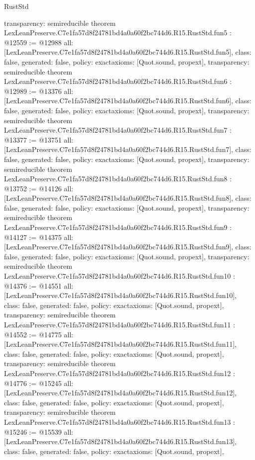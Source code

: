 \begin{lexlean}{RustStd}
\begin{coremodule}
{  transparency: semireducible
}
theorem LexLeanPreserve.C7e1fa57d8f24781bd4a0a60f2bc744d6.R15.RustStd.fun5 : @12559 := @12988 {
  all: [LexLeanPreserve.C7e1fa57d8f24781bd4a0a60f2bc744d6.R15.RustStd.fun5],
  class: false,
  generated: false,
  policy: exact{axioms: [Quot.sound, propext]},
  transparency: semireducible
}
theorem LexLeanPreserve.C7e1fa57d8f24781bd4a0a60f2bc744d6.R15.RustStd.fun6 : @12989 := @13376 {
  all: [LexLeanPreserve.C7e1fa57d8f24781bd4a0a60f2bc744d6.R15.RustStd.fun6],
  class: false,
  generated: false,
  policy: exact{axioms: [Quot.sound, propext]},
  transparency: semireducible
}
theorem LexLeanPreserve.C7e1fa57d8f24781bd4a0a60f2bc744d6.R15.RustStd.fun7 : @13377 := @13751 {
  all: [LexLeanPreserve.C7e1fa57d8f24781bd4a0a60f2bc744d6.R15.RustStd.fun7],
  class: false,
  generated: false,
  policy: exact{axioms: [Quot.sound, propext]},
  transparency: semireducible
}
theorem LexLeanPreserve.C7e1fa57d8f24781bd4a0a60f2bc744d6.R15.RustStd.fun8 : @13752 := @14126 {
  all: [LexLeanPreserve.C7e1fa57d8f24781bd4a0a60f2bc744d6.R15.RustStd.fun8],
  class: false,
  generated: false,
  policy: exact{axioms: [Quot.sound, propext]},
  transparency: semireducible
}
theorem LexLeanPreserve.C7e1fa57d8f24781bd4a0a60f2bc744d6.R15.RustStd.fun9 : @14127 := @14375 {
  all: [LexLeanPreserve.C7e1fa57d8f24781bd4a0a60f2bc744d6.R15.RustStd.fun9],
  class: false,
  generated: false,
  policy: exact{axioms: [Quot.sound, propext]},
  transparency: semireducible
}
theorem LexLeanPreserve.C7e1fa57d8f24781bd4a0a60f2bc744d6.R15.RustStd.fun10 : @14376 := @14551 {
  all: [LexLeanPreserve.C7e1fa57d8f24781bd4a0a60f2bc744d6.R15.RustStd.fun10],
  class: false,
  generated: false,
  policy: exact{axioms: [Quot.sound, propext]},
  transparency: semireducible
}
theorem LexLeanPreserve.C7e1fa57d8f24781bd4a0a60f2bc744d6.R15.RustStd.fun11 : @14552 := @14775 {
  all: [LexLeanPreserve.C7e1fa57d8f24781bd4a0a60f2bc744d6.R15.RustStd.fun11],
  class: false,
  generated: false,
  policy: exact{axioms: [Quot.sound, propext]},
  transparency: semireducible
}
theorem LexLeanPreserve.C7e1fa57d8f24781bd4a0a60f2bc744d6.R15.RustStd.fun12 : @14776 := @15245 {
  all: [LexLeanPreserve.C7e1fa57d8f24781bd4a0a60f2bc744d6.R15.RustStd.fun12],
  class: false,
  generated: false,
  policy: exact{axioms: [Quot.sound, propext]},
  transparency: semireducible
}
theorem LexLeanPreserve.C7e1fa57d8f24781bd4a0a60f2bc744d6.R15.RustStd.fun13 : @15246 := @15539 {
  all: [LexLeanPreserve.C7e1fa57d8f24781bd4a0a60f2bc744d6.R15.RustStd.fun13],
  class: false,
  generated: false,
  policy: exact{axioms: [Quot.sound, propext]},
}
\end{coremodule}
\end{lexlean}
